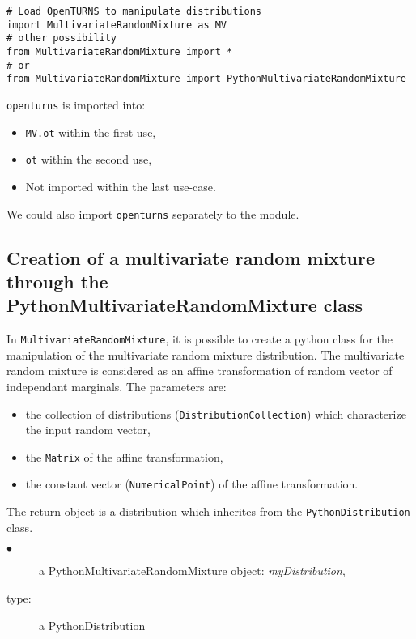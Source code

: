 \begin{lstlisting}
# Load OpenTURNS to manipulate distributions
import MultivariateRandomMixture as MV
# other possibility
from MultivariateRandomMixture import *
# or
from MultivariateRandomMixture import PythonMultivariateRandomMixture
\end{lstlisting}
\texttt{openturns} is imported into: 
\begin{itemize}
   \item \texttt{MV.ot} within the first use,
   \item \texttt{ot} within the second use,
   \item Not imported within the last use-case.
\end{itemize}

We could also import \texttt{openturns} separately to the module.


\subsection{Creation of a multivariate random mixture through the PythonMultivariateRandomMixture class} \label{MVRM}

In \texttt{MultivariateRandomMixture}, it is possible to create a python class for the manipulation of the multivariate random mixture distribution.
The multivariate random mixture is considered as an affine transformation of random vector of independant marginals. 
The parameters are:
\begin{itemize}
 \item the collection of distributions (\texttt{DistributionCollection}) which characterize the input random vector,
 \item the \texttt{Matrix} of the affine transformation, 
 \item the constant vector (\texttt{NumericalPoint}) of the affine transformation.
\end{itemize}

The return object is a distribution which inherites from the \texttt{PythonDistribution} class.

{
  \begin{description}
  \item[$\bullet$] a PythonMultivariateRandomMixture object: \textit{myDistribution},
  \item[type:] a PythonDistribution
  \end{description}
}

